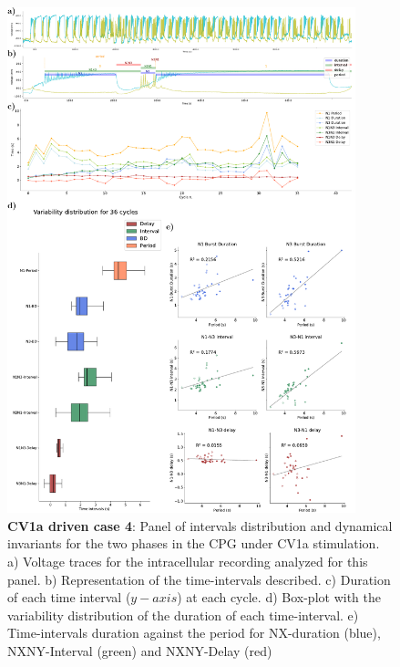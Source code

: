 \begin{figure}[htbp]
	\centering
	\includegraphics[width=0.9\textwidth]{./img/invariants/data/SUSSEX/CV1a_driven3/images/panel_with_intervals.pdf}
	\caption{\textbf{CV1a driven case 4}: Panel of intervals distribution and dynamical invariants for the two phases in the CPG under CV1a stimulation. a) Voltage traces for the intracellular recording analyzed for this panel. b) Representation of the time-intervals described. c) Duration of each time interval ($y-axis$) at each cycle. d) Box-plot with the variability distribution of the duration of each time-interval. e) Time-intervals duration against the period for NX-duration (blue), NXNY-Interval (green) and NXNY-Delay (red)}
	\label{fig:cv1a 3 2phases}
\end{figure}





